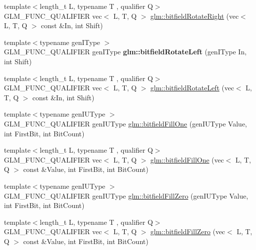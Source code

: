 \begin{DoxyCompactItemize}
\item 
{\footnotesize template$<$length\+\_\+t L, typename T , qualifier Q$>$ }\\G\+L\+M\+\_\+\+F\+U\+N\+C\+\_\+\+Q\+U\+A\+L\+I\+F\+I\+ER vec$<$ L, T, Q $>$ \hyperlink{group__gtc__bitfield_ga590488e1fc00a6cfe5d3bcaf93fbfe88}{glm\+::bitfield\+Rotate\+Right} (vec$<$ L, T, Q $>$ const \&In, int Shift)
\item 
\mbox{\label{bitfield_8inl_ae088d9983f8cb8fcf0aacae4ae51462a}} 
{\footnotesize template$<$typename gen\+I\+Type $>$ }\\G\+L\+M\+\_\+\+F\+U\+N\+C\+\_\+\+Q\+U\+A\+L\+I\+F\+I\+ER gen\+I\+Type {\bfseries glm\+::bitfield\+Rotate\+Left} (gen\+I\+Type In, int Shift)
\item 
{\footnotesize template$<$length\+\_\+t L, typename T , qualifier Q$>$ }\\G\+L\+M\+\_\+\+F\+U\+N\+C\+\_\+\+Q\+U\+A\+L\+I\+F\+I\+ER vec$<$ L, T, Q $>$ \hyperlink{group__gtc__bitfield_gae186317091b1a39214ebf79008d44a1e}{glm\+::bitfield\+Rotate\+Left} (vec$<$ L, T, Q $>$ const \&In, int Shift)
\item 
{\footnotesize template$<$typename gen\+I\+U\+Type $>$ }\\G\+L\+M\+\_\+\+F\+U\+N\+C\+\_\+\+Q\+U\+A\+L\+I\+F\+I\+ER gen\+I\+U\+Type \hyperlink{group__gtc__bitfield_ga46f9295abe3b5c7658f5b13c7f819f0a}{glm\+::bitfield\+Fill\+One} (gen\+I\+U\+Type Value, int First\+Bit, int Bit\+Count)
\item 
{\footnotesize template$<$length\+\_\+t L, typename T , qualifier Q$>$ }\\G\+L\+M\+\_\+\+F\+U\+N\+C\+\_\+\+Q\+U\+A\+L\+I\+F\+I\+ER vec$<$ L, T, Q $>$ \hyperlink{group__gtc__bitfield_ga3e96dd1f0a4bc892f063251ed118c0c1}{glm\+::bitfield\+Fill\+One} (vec$<$ L, T, Q $>$ const \&Value, int First\+Bit, int Bit\+Count)
\item 
{\footnotesize template$<$typename gen\+I\+U\+Type $>$ }\\G\+L\+M\+\_\+\+F\+U\+N\+C\+\_\+\+Q\+U\+A\+L\+I\+F\+I\+ER gen\+I\+U\+Type \hyperlink{group__gtc__bitfield_ga697b86998b7d74ee0a69d8e9f8819fee}{glm\+::bitfield\+Fill\+Zero} (gen\+I\+U\+Type Value, int First\+Bit, int Bit\+Count)
\item 
{\footnotesize template$<$length\+\_\+t L, typename T , qualifier Q$>$ }\\G\+L\+M\+\_\+\+F\+U\+N\+C\+\_\+\+Q\+U\+A\+L\+I\+F\+I\+ER vec$<$ L, T, Q $>$ \hyperlink{group__gtc__bitfield_ga0d16c9acef4be79ea9b47c082a0cf7c2}{glm\+::bitfield\+Fill\+Zero} (vec$<$ L, T, Q $>$ const \&Value, int First\+Bit, int Bit\+Count)

\end{DoxyCompactItemize}
